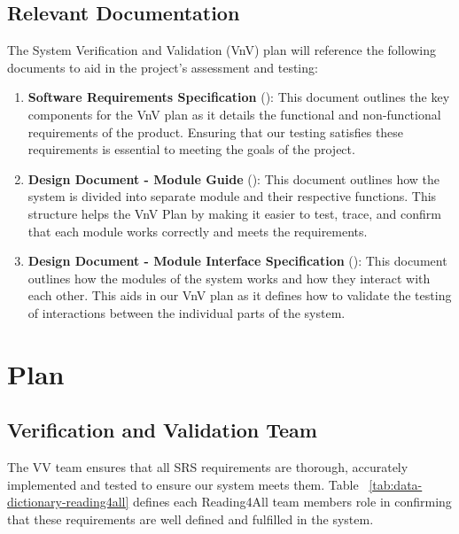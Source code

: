 \documentclass[12pt, titlepage]{article}
\begin{document}
\subsection{Relevant Documentation}
The System Verification and Validation (VnV) plan will reference the
following documents to aid in
the project's assessment and testing:
\begin{enumerate}
  \item \textbf{Software Requirements Specification} (\citet{SRS}):
    This document outlines the key components
    for the VnV plan as it details the functional and non-functional
    requirements of the product. Ensuring that our testing
    satisfies these requirements is essential to meeting the goals of
    the project.
  \item \textbf{Design Document - Module Guide} (\citet{MG}): This
    document outlines how the system is divided into separate module
    and their respective functions.
    This structure helps the VnV Plan by making it easier to test,
    trace, and confirm that each module works correctly and meets the
    requirements.
  \item \textbf{Design Document - Module Interface Specification}
    (\citet{MIS}): This document outlines how the modules of the
    system works and how they interact with each other.
    This aids in our VnV plan as it defines how to validate the
    testing of interactions between the individual parts of the system.
\end{enumerate}

\section{Plan}


\subsection{Verification and Validation Team}


The V\*V team ensures that all SRS requirements are thorough, accurately implemented and tested to ensure our system meets them. 
Table ~\ref{tab:data-dictionary-reading4all} defines each Reading4All team members role in confirming that these requirements are well defined and fulfilled in the system.
\end{document}

